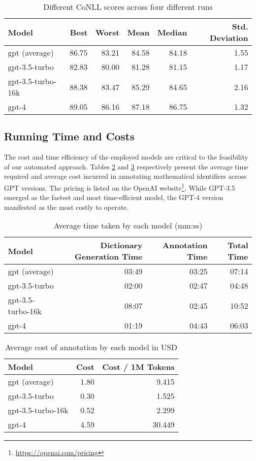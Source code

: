 \begin{table}[htpb]
  \centering
  \begin{tabular}{lrrrrr}
    \hline
    Model & Best & Worst & Mean & Median & Std. Deviation \\
    \hline
    gpt (average) & 86.75 & 83.21 & 84.58 & 84.18 & 1.55 \\
    gpt-3.5-turbo & 82.83 & 80.00 & 81.28 & 81.15 & 1.17 \\
    gpt-3.5-turbo-16k & 88.38 & 83.47 & 85.29 & 84.65 & 2.16 \\
    gpt-4 & 89.05 & 86.16 & 87.18 & 86.75 & 1.32 \\
    \hline
  \end{tabular}
  \caption[Statistics of variance]{Different CoNLL scores across four different runs}
  \label{tab:variance}
\end{table}

\subsection{Running Time and Costs}

The cost and time efficiency of the employed models are critical to the feasibility of our automated approach. Tables \ref{tab:time} and \ref{tab:cost} respectively present the average time required and average cost incurred in annotating mathematical identifiers across GPT versions. The pricing is listed on the OpenAI website\footnote{\url{https://openai.com/pricing}}. While GPT-3.5 emerged as the fastest and most time-efficient model, the GPT-4 version manifested as the most costly to operate.

\begin{table}[htpb]
  \centering
  \begin{tabular}{lrrr}
    \hline
    Model & Dictionary Generation Time & Annotation Time & Total Time \\
    \hline
    gpt (average) & 03:49 & 03:25 & 07:14 \\
    gpt-3.5-turbo & 02:00 & 02:47 & 04:48 \\
    gpt-3.5-turbo-16k & 08:07 & 02:45 & 10:52 \\
    gpt-4 & 01:19 & 04:43 & 06:03 \\
    \hline
  \end{tabular}
  \caption[Average time taken]{Average time taken by each model (mm:ss)}
  \label{tab:time}
\end{table}

\begin{table}[htpb]
  \centering
  \begin{tabular}{lrr}
    \hline
    Model & Cost & Cost / 1M Tokens \\
    \hline
    gpt (average) & 1.80 & 9.415 \\
    gpt-3.5-turbo & 0.30 & 1.525 \\
    gpt-3.5-turbo-16k & 0.52 & 2.299 \\
    gpt-4 & 4.59 & 30.449 \\
    \hline
  \end{tabular}
  \caption[Cost Analysis]{Average cost of annotation by each model in USD}
  \label{tab:cost}
\end{table}


